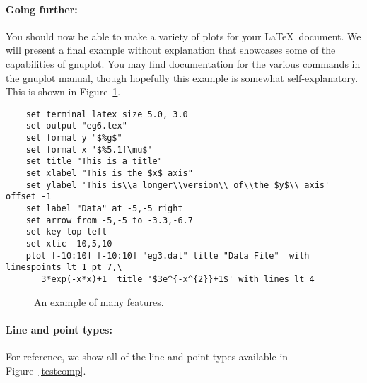 
\paragraph{Going further:} You should now be able to make a variety of
plots for your \LaTeX\ document. We will present a final example
without explanation that showcases some of the capabilities of
gnuplot. You may find documentation for the various commands in the
gnuplot manual, though hopefully this example is somewhat
self-explanatory. This is shown in Figure~\ref{eg6}.

\singlespace
\begin{verbatim}
    set terminal latex size 5.0, 3.0
    set output "eg6.tex"
    set format y "$%g$"
    set format x '$%5.1f\mu$'
    set title "This is a title"
    set xlabel "This is the $x$ axis" 
    set ylabel 'This is\\a longer\\version\\ of\\the $y$\\ axis' offset -1
    set label "Data" at -5,-5 right
    set arrow from -5,-5 to -3.3,-6.7
    set key top left
    set xtic -10,5,10
    plot [-10:10] [-10:10] "eg3.dat" title "Data File"  with linespoints lt 1 pt 7,\
       3*exp(-x*x)+1  title '$3e^{-x^{2}}+1$' with lines lt 4
\end{verbatim}
\currentspace

\begin{figure}
  \begin{center}
    
  \end{center}
  \caption{An example of many features.}
  \label{eg6}
\end{figure}

\paragraph{Line and point types:} For reference, we show all of the
line and point types available in Figure~\ref{testcomp}.

